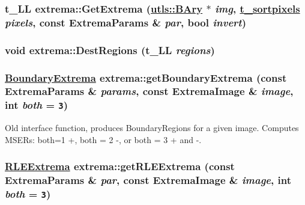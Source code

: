 \hypertarget{namespaceextrema_6fa06d87bc447f8bb199c9ad11bb1448}{
\subsubsection[GetExtrema]{\setlength{\rightskip}{0pt plus 5cm}t\_\-LL extrema::Get\-Extrema (\hyperlink{structutls_1_1Ary}{utls::BAry} $\ast$ {\em img}, \hyperlink{namespaceextrema_fe82307c3b119c3da09a001341fa3560}{t\_\-sortpixels} {\em pixels}, const Extrema\-Params \& {\em par}, bool {\em invert})}}
\label{namespaceextrema_6fa06d87bc447f8bb199c9ad11bb1448}


\hypertarget{namespaceextrema_1ddc04cbc97430b6127e80eba26a0fb0}{
\subsubsection[DestRegions]{\setlength{\rightskip}{0pt plus 5cm}void extrema::Dest\-Regions (t\_\-LL {\em regions})}}
\label{namespaceextrema_1ddc04cbc97430b6127e80eba26a0fb0}


\hypertarget{namespaceextrema_6287a927a289e58f10e7cf51a2420839}{
\subsubsection[getBoundaryExtrema]{\setlength{\rightskip}{0pt plus 5cm}\hyperlink{structextrema_1_1BoundaryExtrema}{Boundary\-Extrema} extrema::get\-Boundary\-Extrema (const Extrema\-Params \& {\em params}, const Extrema\-Image \& {\em image}, int {\em both} = {\tt 3})}}
\label{namespaceextrema_6287a927a289e58f10e7cf51a2420839}


Old interface function, produces Boundary\-Regions for a given image. Computes MSERs: both=1 +, both = 2 -, or both = 3 + and -. 

\hypertarget{namespaceextrema_6898d264cefada5cdda1486f1b58b97e}{
\subsubsection[getRLEExtrema]{\setlength{\rightskip}{0pt plus 5cm}\hyperlink{structextrema_1_1RLEExtrema}{RLEExtrema} extrema::get\-RLEExtrema (const Extrema\-Params \& {\em par}, const Extrema\-Image \& {\em image}, int {\em both} = {\tt 3})}}
\label{namespaceextrema_6898d264cefada5cdda1486f1b58b97e}


